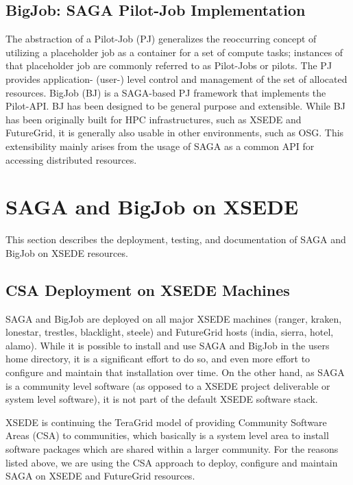 \documentclass{sig-alternate}
\begin{document}
\subsection{BigJob: SAGA Pilot-Job Implementation}
The abstraction of a Pilot-Job (PJ) generalizes the reoccurring concept
of utilizing a placeholder job as a container for a set of compute tasks;
instances of that placeholder job are commonly referred to as Pilot-Jobs or
pilots. The PJ provides application- (user-) level control and management of the
set of allocated resources. BigJob (BJ) is a SAGA-based PJ framework that
implements the Pilot-API. BJ has been designed to be general purpose and
extensible. While BJ has been originally built for HPC infrastructures, such as
XSEDE and FutureGrid, it is generally also usable in other environments, such as
OSG. This extensibility mainly arises from the usage of SAGA as a common API for
accessing distributed resources. ~\cite{saga_bigjob_condor_cloud, pstar11}


\section{SAGA and BigJob on XSEDE}

This section describes the deployment, testing, and documentation of SAGA and BigJob on XSEDE resources. 

\subsection{CSA Deployment on XSEDE Machines}
 \label{ssec:csa}

 SAGA and BigJob are deployed on all major XSEDE machines (ranger,
 kraken, lonestar, trestles, blacklight, steele) and FutureGrid hosts
 (india, sierra, hotel, alamo).  While it is possible to install and
 use SAGA and BigJob in the users home directory, it is a significant
 effort to do so, and even more effort to configure and maintain that
 installation over time. On the other hand, as SAGA is a community
 level software (as opposed to a XSEDE project deliverable or system
 level software), it is not part of the default XSEDE software stack.

 XSEDE is continuing the TeraGrid model of providing Community
 Software Areas (CSA) to communities, which basically is a system
 level area to install software packages which are shared within a
 larger community.  For the reasons listed above, we are using the CSA
 approach to deploy, configure and maintain SAGA on XSEDE and
 FutureGrid resources.
\end{document}
